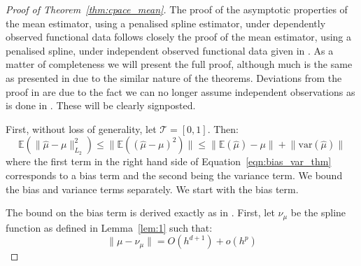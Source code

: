 \begin{proof}[Proof of Theorem~\ref{thm:cpace_mean}]
	The proof of the asymptotic properties of the mean estimator, using a penalised spline estimator, under dependently observed functional data follows closely the proof of the mean estimator, using a penalised spline, under independent observed functional data given in \citep{xiao_asymptotic_2020}.
	As a matter of completeness we will present the full proof, although much is the same as presented in \citep{xiao_asymptotic_2020} due to the similar nature of the theorems.
	Deviations from the proof in \citep{xiao_asymptotic_2020} are due to the fact we can no longer assume independent observations as is done in \citep{xiao_asymptotic_2020}.
	These will be clearly signposted. 
	
	First, without loss of generality, let $\mathcal{T} = \left[0, 1\right]$.
	Then:
	\begin{equation}
		\mathbb{E} \left(\lVert \hat{\mu} - \mu \rVert_{L_2}^2 \right) \leq \lVert \mathbb{E}\left( \left(\hat{\mu} - \mu \right)^2 \right) \rVert \leq \lVert \mathbb{E}\left(\hat{\mu}\right) - \mu \rVert + \lVert \text{var}\left(\hat{\mu}\right)\rVert
		\label{eqn:bias_var_thm}
	\end{equation}
where the first term in the right hand side of Equation~\eqref{eqn:bias_var_thm} corresponds to a bias term and the second being the variance term.
We bound the bias and variance terms separately.
We start with the bias term. 

The bound on the bias term is derived exactly as in \citep{xiao_asymptotic_2020}. 
First, let $\nu_\mu$ be the spline function as defined in Lemma~\ref{lem:1} such that: 
\begin{equation}
		\lVert \mu - \nu_\mu \rVert = O\left( h^{d+1} \right) + o(h^{p})
		\label{eqn:cpace_mu_nu_bound}
\end{equation}


\end{proof}
